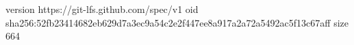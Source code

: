 version https://git-lfs.github.com/spec/v1
oid sha256:52fb23414682eb629d7a3ec9a54c2e2f447ee8a917a2a72a5492ac5f13c67aff
size 664
